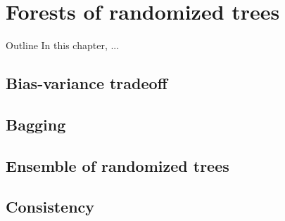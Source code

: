 \chapter{Forests of randomized trees}\label{ch:forest}

\begin{remark}{Outline}
In this chapter, ...
\end{remark}

\section{Bias-variance tradeoff}


\section{Bagging}


\section{Ensemble of randomized trees}


\section{Consistency}

